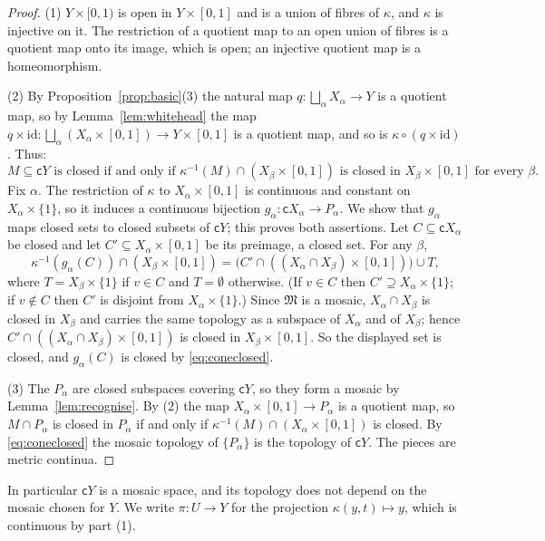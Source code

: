 \documentclass[11pt]{amsart}
\theoremstyle{definition}
\theoremstyle{remark}
\newcommand{\fM}{\mathfrak{M}}
\newcommand{\cone}{\mathsf{c}}
\numberwithin{equation}{section}
\begin{document}
\begin{proof}
(1) $Y\times[0,1)$ is open in $Y\times[0,1]$ and is a union of fibres of $\kappa$, and $\kappa$ is injective on it. The restriction of a quotient map to an open union of fibres is a quotient map onto its image, which is open; an injective quotient map is a homeomorphism.

(2) By Proposition~\ref{prop:basic}(3) the natural map $q\colon\bigsqcup_\alpha X_\alpha\to Y$ is a quotient map, so by Lemma~\ref{lem:whitehead} the map $q\times\mathrm{id}\colon\bigsqcup_\alpha(X_\alpha\times[0,1])\to Y\times[0,1]$ is a quotient map, and so is $\kappa\circ(q\times\mathrm{id})$. Thus:
\begin{equation}\label{eq:coneclosed}
\text{$M\subseteq\cone Y$ is closed if and only if $\kappa^{-1}(M)\cap(X_\beta\times[0,1])$ is closed in $X_\beta\times[0,1]$ for every $\beta$.}
\end{equation}
Fix $\alpha$. The restriction of $\kappa$ to $X_\alpha\times[0,1]$ is continuous and constant on $X_\alpha\times\{1\}$, so it induces a continuous bijection $g_\alpha\colon\cone X_\alpha\to P_\alpha$. We show that $g_\alpha$ maps closed sets to closed subsets of $\cone Y$; this proves both assertions. Let $C\subseteq\cone X_\alpha$ be closed and let $C'\subseteq X_\alpha\times[0,1]$ be its preimage, a closed set. For any $\beta$,
\[\kappa^{-1}(g_\alpha(C))\cap(X_\beta\times[0,1])=\bigl(C'\cap((X_\alpha\cap X_\beta)\times[0,1])\bigr)\cup T,\]
where $T=X_\beta\times\{1\}$ if $v\in C$ and $T=\emptyset$ otherwise. (If $v\in C$ then $C'\supseteq X_\alpha\times\{1\}$; if $v\notin C$ then $C'$ is disjoint from $X_\alpha\times\{1\}$.) Since $\fM$ is a mosaic, $X_\alpha\cap X_\beta$ is closed in $X_\beta$ and carries the same topology as a subspace of $X_\alpha$ and of $X_\beta$; hence $C'\cap((X_\alpha\cap X_\beta)\times[0,1])$ is closed in $X_\beta\times[0,1]$. So the displayed set is closed, and $g_\alpha(C)$ is closed by \eqref{eq:coneclosed}.

(3) The $P_\alpha$ are closed subspaces covering $\cone Y$, so they form a mosaic by Lemma~\ref{lem:recognise}. By (2) the map $X_\alpha\times[0,1]\to P_\alpha$ is a quotient map, so $M\cap P_\alpha$ is closed in $P_\alpha$ if and only if $\kappa^{-1}(M)\cap(X_\alpha\times[0,1])$ is closed. By \eqref{eq:coneclosed} the mosaic topology of $\{P_\alpha\}$ is the topology of $\cone Y$. The pieces are metric continua.
\end{proof}

In particular $\cone Y$ is a mosaic space, and its topology does not depend on the mosaic chosen for $Y$. We write $\pi\colon U\to Y$ for the projection $\kappa(y,t)\mapsto y$, which is continuous by part (1).
\end{document}
